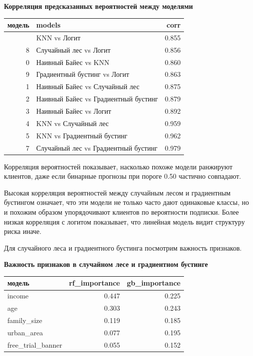 \documentclass[11pt]{article}
\newcounter{none}
\begin{document}
    \textbf{Корреляция предсказанных вероятностей между моделями}

{\def\LTcaptype{none} %
\begin{longtable}[]{@{}rlr@{}}
\toprule\noalign{}
модель & models & corr \\
\midrule\noalign{}
\endhead
\bottomrule\noalign{}
\endlastfoot
6 & KNN vs Логит & 0.855 \\
8 & Случайный лес vs Логит & 0.856 \\
0 & Наивный Байес vs KNN & 0.860 \\
9 & Градиентный бустинг vs Логит & 0.863 \\
1 & Наивный Байес vs Случайный лес & 0.875 \\
2 & Наивный Байес vs Градиентный бустинг & 0.879 \\
3 & Наивный Байес vs Логит & 0.892 \\
4 & KNN vs Случайный лес & 0.959 \\
5 & KNN vs Градиентный бустинг & 0.962 \\
7 & Случайный лес vs Градиентный бустинг & 0.979 \\
\end{longtable}
}

    Корреляция вероятностей показывает, насколько похоже модели ранжируют
клиентов, даже если бинарные прогнозы при пороге 0.50 частично
совпадают.

Высокая корреляция вероятностей между случайным лесом и градиентным
бустингом означает, что эти модели не только часто дают одинаковые
классы, но и похожим образом упорядочивают клиентов по вероятности
подписки. Более низкая корреляция с логитом показывает, что линейная
модель видит структуру риска иначе.

    Для случайного леса и градиентного бустинга посмотрим важность
признаков.

    \textbf{Важность признаков в случайном лесе и градиентном бустинге}

{\def\LTcaptype{none} %
\begin{longtable}[]{@{}lrr@{}}
\toprule\noalign{}
модель & rf\_importance & gb\_importance \\
\midrule\noalign{}
\endhead
\bottomrule\noalign{}
\endlastfoot
income & 0.447 & 0.225 \\
age & 0.303 & 0.243 \\
family\_size & 0.119 & 0.185 \\
urban\_area & 0.077 & 0.195 \\
free\_trial\_banner & 0.055 & 0.152 \\
\end{longtable}
}
\end{document}
